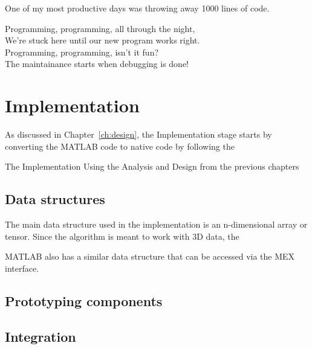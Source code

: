 
\begin{savequote}[0.55\linewidth]
	\begin{fancyquote}
	One of my most productive days was throwing away 1000 lines of code.
	\end{fancyquote}
	\begin{fancyquote}
		Programming, programming, all through the night,\\
		We're stuck here until our new program works right.\\
		Programming, programming, isn't it fun?\\
		The maintainance starts when debugging is done!
	\end{fancyquote}
\end{savequote}
\chapter{Implementation}\label{ch:implementation}

As discussed in Chapter~\ref{ch:design}, the Implementation stage
starts by converting the MATLAB code to native code by following
the 

The Implementation
Using the Analysis and Design from the previous chapters

\section{Data structures}


The main data structure used in the implementation is an
n-dimensional array or tensor. Since the algorithm is meant to
work with 3D data, the 

MATLAB also has a similar data structure that can be accessed via the MEX interface.

\section{Prototyping components}

\section{Integration}

